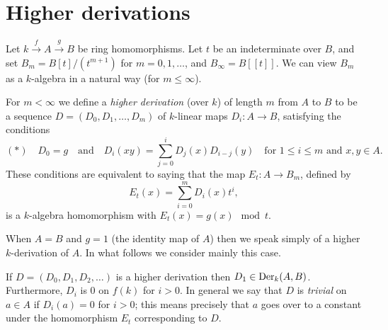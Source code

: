 \section{Higher derivations}\label{sec:27}

Let $k \xrightarrow{f} A \xrightarrow{g} B$ be ring homomorphisms. Let $t$ be an indeterminate
over $B$, and set $B_m = B[t]/(t^{m+1})$ for $m = 0, 1, \ldots$, and $B_\infty = B[[t]]$. We can
view $B_m$ as a $k$-algebra in a natural way (for $m \le \infty$).

For $m < \infty$ we define a \emph{higher derivation} (over $k$) of length $m$ from $A$ to
$B$ to be a sequence $D = (D_0, D_1, \ldots, D_m)$ of $k$-linear maps
$D_i\colon A \to B$, satisfying the conditions
\[
  (*) \quad D_0 = g \quad \text{and} \quad D_i(xy) = \sum_{j=0}^i D_j(x)D_{i-j}(y)
      \quad \text{for } 1 \le i \le m \text{ and } x, y \in A.
\]
These conditions are equivalent to saying that the map $E_t\colon A \to B_m$, defined by
\[
  E_t(x) = \sum_{i=0}^m D_i(x)t^i,
\]
is a $k$-algebra homomorphism with $E_t(x) = g(x) \mod t$.

When $A = B$ and $g = 1$ (the identity map of $A$) then we speak simply of a higher
$k$-derivation of $A$. In what follows we consider mainly this case.

If $D = (D_0, D_1, D_2, \ldots)$ is a higher derivation then $D_1 \in \operatorname{Der}_k(A, B)$.
Furthermore, $D_i$ is $0$ on $f(k)$ for $i > 0$. In general we say that $D$ is \emph{trivial}
on $a \in A$ if $D_i(a) = 0$ for $i > 0$; this means precisely that $a$ goes over to a
constant under the homomorphism $E_t$ corresponding to $D$.

